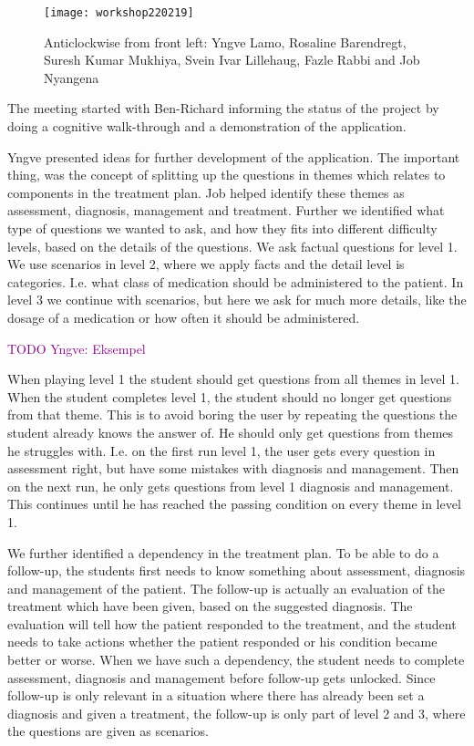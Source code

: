 \begin{figure}[h!]
	\caption {Anticlockwise from front left: Yngve Lamo, Rosaline Barendregt, Suresh Kumar Mukhiya, Svein Ivar Lillehaug, Fazle Rabbi and Job Nyangena}
	\texttt{[image: workshop220219]}
\end{figure}

The meeting started with Ben-Richard informing the status of the project by doing a cognitive walk-through and a demonstration of the application. 

Yngve presented ideas for further development of the application. The important thing, was the concept of splitting up the questions in themes which relates to components in the treatment plan. Job helped identify these themes as assessment, diagnosis, management and treatment. Further we identified what type of questions we wanted to ask, and how they fits into different difficulty levels, based on the details of the questions. We ask factual questions for level 1. We use scenarios in level 2, where we apply facts and the detail level is categories. I.e. what class of medication should be administered to the patient. In level 3 we continue with scenarios, but here we ask for much more details, like the dosage of a medication or how often it should be administered.

\textcolor{purple}{TODO Yngve: Eksempel}

When playing level 1 the student should get questions from all themes in level 1. When the student completes level 1, the student should no longer get questions from that theme. This is to avoid boring the user by repeating the questions the student already knows the answer of. He should only get questions from themes he struggles with. I.e. on the first run level 1, the user gets every question in assessment right, but have some mistakes with diagnosis and management. Then on the next run, he only gets questions from level 1 diagnosis and management. This continues until he has reached the passing condition on every theme in level 1. 

We further identified a dependency in the treatment plan. To be able to do a follow-up, the students first needs to know something about assessment, diagnosis and management of the patient. The follow-up is actually an evaluation of the treatment which have been given, based on the suggested diagnosis. The evaluation will tell how the patient responded to the treatment, and the student needs to take actions whether the patient responded or his condition became better or worse. When we have such a dependency, the student needs to complete assessment, diagnosis and management before follow-up gets unlocked. Since follow-up is only relevant in a situation where there has already been set a diagnosis and given a treatment, the follow-up is only part of level 2 and 3, where the questions are given as scenarios.

